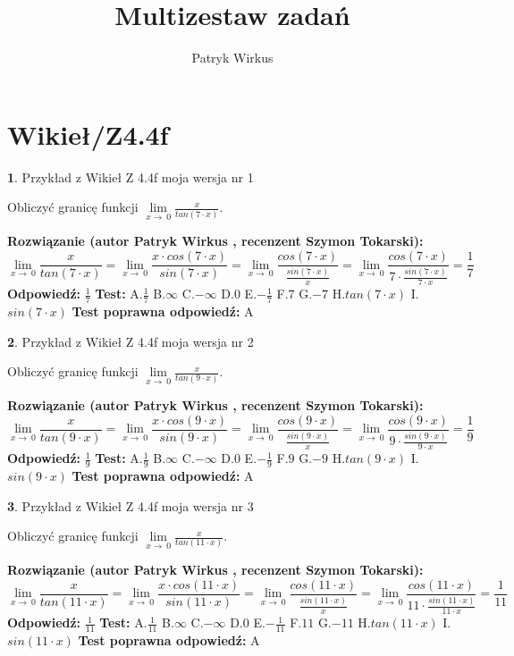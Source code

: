 \documentclass[12pt, a4paper]{article}
\title{Multizestaw zadań}
\author{Patryk Wirkus}
\date{}
\theoremstyle{definition} %
\newtheorem{zad}{}
\newcommand{\kategoria}[1]{\section{#1}}
\newcommand{\zadStart}[1]{\begin{zad}#1\newline}
\newcommand{\zadStop}{\end{zad}}
\newcommand{\rozwStart}[2]{\noindent \textbf{Rozwiązanie (autor #1 , recenzent #2): }\newline}
\newcommand{\rozwStop}{\newline}
\newcommand{\odpStart}{\noindent \textbf{Odpowiedź:}\newline}
\newcommand{\odpStop}{\newline}
\newcommand{\testStart}{\noindent \textbf{Test:}\newline}
\newcommand{\testStop}{\newline}
\newcommand{\kluczStart}{\noindent \textbf{Test poprawna odpowiedź:}\newline}
\newcommand{\kluczStop}{\newline}
\begin{document}
\maketitle

\kategoria{Wikieł/Z4.4f}


\zadStart{Przykład z Wikieł Z 4.4f moja wersja nr 1}


Obliczyć granicę funkcji $\lim\limits_{x\to\ 0}\frac{x}{tan(7 \cdot x)}$.
\zadStop
\rozwStart{Patryk Wirkus}{Szymon Tokarski}
$$\lim\limits_{x\to\ 0}\frac{x}{tan(7 \cdot x)}=\lim\limits_{x\to\ 0}\frac{x \cdot cos(7 \cdot x)}{sin(7 \cdot x)}=\lim\limits_{x\to\ 0}\frac{cos(7 \cdot x)}{\frac{sin(7 \cdot x)}{x}}=\lim\limits_{x\to\ 0}\frac{cos(7 \cdot x)}{7 \cdot \frac{sin(7 \cdot x)}{7 \cdot x}} = \frac{1}{7}$$
\rozwStop
\odpStart
$\frac{1}{7}$
\odpStop
\testStart
A.$\frac{1}{7}$
B.$\infty$
C.$-\infty$
D.$0$
E.$-\frac{1}{7}$
F.$7$
G.$-7$
H.$tan(7 \cdot x)$
I.$sin(7 \cdot x)$
\testStop
\kluczStart
A
\kluczStop



\zadStart{Przykład z Wikieł Z 4.4f moja wersja nr 2}


Obliczyć granicę funkcji $\lim\limits_{x\to\ 0}\frac{x}{tan(9 \cdot x)}$.
\zadStop
\rozwStart{Patryk Wirkus}{Szymon Tokarski}
$$\lim\limits_{x\to\ 0}\frac{x}{tan(9 \cdot x)}=\lim\limits_{x\to\ 0}\frac{x \cdot cos(9 \cdot x)}{sin(9 \cdot x)}=\lim\limits_{x\to\ 0}\frac{cos(9 \cdot x)}{\frac{sin(9 \cdot x)}{x}}=\lim\limits_{x\to\ 0}\frac{cos(9 \cdot x)}{9 \cdot \frac{sin(9 \cdot x)}{9 \cdot x}} = \frac{1}{9}$$
\rozwStop
\odpStart
$\frac{1}{9}$
\odpStop
\testStart
A.$\frac{1}{9}$
B.$\infty$
C.$-\infty$
D.$0$
E.$-\frac{1}{9}$
F.$9$
G.$-9$
H.$tan(9 \cdot x)$
I.$sin(9 \cdot x)$
\testStop
\kluczStart
A
\kluczStop



\zadStart{Przykład z Wikieł Z 4.4f moja wersja nr 3}


Obliczyć granicę funkcji $\lim\limits_{x\to\ 0}\frac{x}{tan(11 \cdot x)}$.
\zadStop
\rozwStart{Patryk Wirkus}{Szymon Tokarski}
$$\lim\limits_{x\to\ 0}\frac{x}{tan(11 \cdot x)}=\lim\limits_{x\to\ 0}\frac{x \cdot cos(11 \cdot x)}{sin(11 \cdot x)}=\lim\limits_{x\to\ 0}\frac{cos(11 \cdot x)}{\frac{sin(11 \cdot x)}{x}}=\lim\limits_{x\to\ 0}\frac{cos(11 \cdot x)}{11 \cdot \frac{sin(11 \cdot x)}{11 \cdot x}} = \frac{1}{11}$$
\rozwStop
\odpStart
$\frac{1}{11}$
\odpStop
\testStart
A.$\frac{1}{11}$
B.$\infty$
C.$-\infty$
D.$0$
E.$-\frac{1}{11}$
F.$11$
G.$-11$
H.$tan(11 \cdot x)$
I.$sin(11 \cdot x)$
\testStop
\kluczStart
A
\kluczStop
\end{document}
